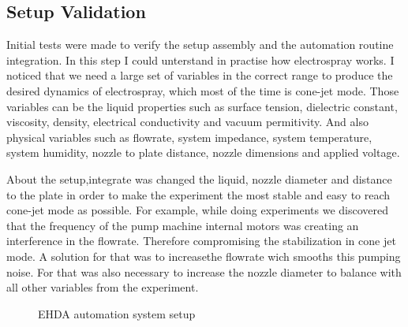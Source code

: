 \subsection{Setup Validation}
\label{subsec:setup_validation}

Initial tests were made to verify the setup assembly and the automation routine integration. In this step I could unterstand in practise how electrospray works.
I noticed that we need a large set of variables in the correct range to produce the desired dynamics of electrospray, which most of the time is cone-jet mode.
 Those variables can be the liquid properties such as surface tension, dielectric constant, viscosity, density, electrical conductivity and vacuum permitivity. 
 And also physical variables such as flowrate, system impedance, system temperature, system humidity, nozzle to plate distance, nozzle dimensions and applied voltage.


 About the setup,integrate was changed the liquid, nozzle diameter and distance to the plate in order to
make the experiment the most stable and easy to reach cone-jet mode as possible. For example, while doing experiments we discovered that the frequency of the pump machine internal motors was creating an interference in the flowrate. Therefore compromising the stabilization in cone jet mode. A solution for that was to increasethe flowrate wich smooths this pumping noise. For that was also necessary to increase the nozzle diameter to balance with all other variables from the experiment.


    
    \begin{figure}[H]
        \centering
        \caption{EHDA automation system setup}
        \label{fig:metodology_example1}
    \end{figure}

